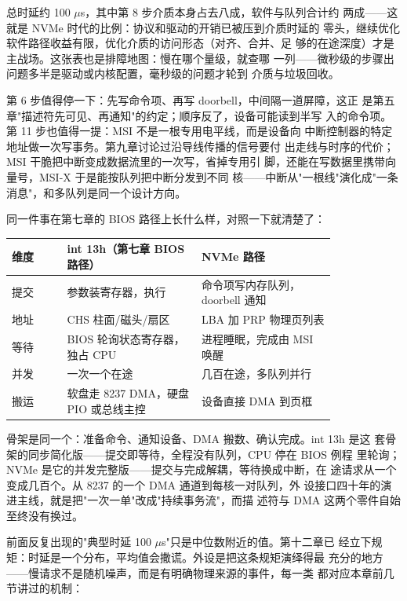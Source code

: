 总时延约 100 $\mu$s，其中第 8 步介质本身占去八成，软件与队列合计约
两成——这就是 NVMe 时代的比例：协议和驱动的开销已被压到介质时延的
零头，继续优化软件路径收益有限，优化介质的访问形态（对齐、合并、足
够的在途深度）才是主战场。这张表也是排障地图：慢在哪个量级，就查哪
一列——微秒级的步骤出问题多半是驱动或内核配置，毫秒级的问题才轮到
介质与垃圾回收。

第 6 步值得停一下：先写命令项、再写 doorbell，中间隔一道屏障，这正
是第五章"描述符先可见、再通知"的约定；顺序反了，设备可能读到半写
入的命令项。第 11 步也值得一提：MSI 不是一根专用电平线，而是设备向
中断控制器的特定地址做一次写事务。第九章讨论过沿导线传播的信号要付
出走线与时序的代价；MSI 干脆把中断变成数据流里的一次写，省掉专用引
脚，还能在写数据里携带向量号，MSI-X 于是能按队列把中断分发到不同
核——中断从"一根线"演化成"一条消息"，和多队列是同一个设计方向。

同一件事在第七章的 BIOS 路径上长什么样，对照一下就清楚了：

\begin{longtable}{L{0.14\linewidth}L{0.34\linewidth}L{0.34\linewidth}}
\toprule
维度 & int 13h（第七章 BIOS 路径） & NVMe 路径 \\
\midrule
提交 & 参数装寄存器，执行  & 命令项写内存队列，doorbell 通知 \\
地址 & CHS 柱面/磁头/扇区 & LBA 加 PRP 物理页列表 \\
等待 & BIOS 轮询状态寄存器，独占 CPU & 进程睡眠，完成由 MSI 唤醒 \\
并发 & 一次一个在途 & 几百在途，多队列并行 \\
搬运 & 软盘走 8237 DMA，硬盘 PIO 或总线主控 & 设备直接 DMA 到页框 \\
\bottomrule
\end{longtable}

骨架是同一个：准备命令、通知设备、DMA 搬数、确认完成。int 13h 是这
套骨架的同步简化版——提交即等待，全程没有队列，CPU 停在 BIOS 例程
里轮询；NVMe 是它的并发完整版——提交与完成解耦，等待换成中断，在
途请求从一个变成几百个。从 8237 的一个 DMA 通道到每核一对队列，外
设接口四十年的演进主线，就是把"一次一单"改成"持续事务流"，而描
述符与 DMA 这两个零件自始至终没有换过。

前面反复出现的"典型时延 100 $\mu$s"只是中位数附近的值。第十二章已
经立下规矩：时延是一个分布，平均值会撒谎。外设是把这条规矩演绎得最
充分的地方——慢请求不是随机噪声，而是有明确物理来源的事件，每一类
都对应本章前几节讲过的机制：

